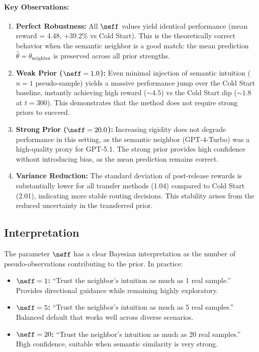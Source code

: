 \paragraph{Key Observations:}

\begin{enumerate}[leftmargin=*]
    \item \textbf{Perfect Robustness:} All $\neff$ values yield identical 
    performance (mean reward = 4.48, +39.2\% vs Cold Start). This is the theoretically 
    correct behavior when the semantic neighbor is a good match: the mean prediction 
    $\hat{\theta} = \theta_{\text{neighbor}}$ is preserved across all prior strengths.
    
    \item \textbf{Weak Prior ($\neff=1.0$):} Even minimal injection of 
    semantic intuition ($n=1$ pseudo-sample) yields a massive performance jump over 
    the Cold Start baseline, instantly achieving high reward ($\sim 4.5$) vs the 
    Cold Start dip ($\sim 1.8$ at $t=300$). This demonstrates that the method does 
    not require strong priors to succeed.
    
    \item \textbf{Strong Prior ($\neff=20.0$):} Increasing rigidity does 
    not degrade performance in this setting, as the semantic neighbor (GPT-4-Turbo) 
    was a high-quality proxy for GPT-5.1. The strong prior provides high confidence 
    without introducing bias, as the mean prediction remains correct.
    
    \item \textbf{Variance Reduction:} The standard deviation of post-release rewards 
    is substantially lower for all transfer methods (1.04) compared to Cold Start (2.01), 
    indicating more stable routing decisions. This stability arises from the reduced 
    uncertainty in the transferred prior.
\end{enumerate}

\subsection{Interpretation}

The parameter $\neff$ has a clear Bayesian interpretation as the number 
of pseudo-observations contributing to the prior. In practice:

\begin{itemize}[leftmargin=*,noitemsep]
    \item \textbf{$\neff = 1$:} ``Trust the neighbor's intuition as much 
    as 1 real sample.'' Provides directional guidance while remaining highly exploratory.
    
    \item \textbf{$\neff = 5$:} ``Trust the neighbor's intuition as much 
    as 5 real samples.'' Balanced default that works well across diverse scenarios.
    
    \item \textbf{$\neff = 20$:} ``Trust the neighbor's intuition as much 
    as 20 real samples.'' High confidence, suitable when semantic similarity is very strong.
\end{itemize}

